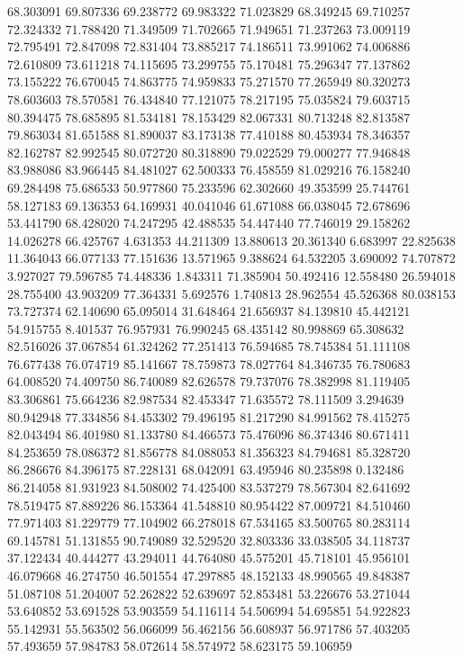 68.303091
69.807336
69.238772
69.983322
71.023829
68.349245
69.710257
72.324332
71.788420
71.349509
71.702665
71.949651
71.237263
73.009119
72.795491
72.847098
72.831404
73.885217
74.186511
73.991062
74.006886
72.610809
73.611218
74.115695
73.299755
75.170481
75.296347
77.137862
73.155222
76.670045
74.863775
74.959833
75.271570
77.265949
80.320273
78.603603
78.570581
76.434840
77.121075
78.217195
75.035824
79.603715
80.394475
78.685895
81.534181
78.153429
82.067331
80.713248
82.813587
79.863034
81.651588
81.890037
83.173138
77.410188
80.453934
78.346357
82.162787
82.992545
80.072720
80.318890
79.022529
79.000277
77.946848
83.988086
83.966445
84.481027
62.500333
76.458559
81.029216
76.158240
69.284498
75.686533
50.977860
75.233596
62.302660
49.353599
25.744761
58.127183
69.136353
64.169931
40.041046
61.671088
66.038045
72.678696
53.441790
68.428020
74.247295
42.488535
54.447440
77.746019
29.158262
14.026278
66.425767
4.631353
44.211309
13.880613
20.361340
6.683997
22.825638
11.364043
66.077133
77.151636
13.571965
9.388624
64.532205
3.690092
74.707872
3.927027
79.596785
74.448336
1.843311
71.385904
50.492416
12.558480
26.594018
28.755400
43.903209
77.364331
5.692576
1.740813
28.962554
45.526368
80.038153
73.727374
62.140690
65.095014
31.648464
21.656937
84.139810
45.442121
54.915755
8.401537
76.957931
76.990245
68.435142
80.998869
65.308632
82.516026
37.067854
61.324262
77.251413
76.594685
78.745384
51.111108
76.677438
76.074719
85.141667
78.759873
78.027764
84.346735
76.780683
64.008520
74.409750
86.740089
82.626578
79.737076
78.382998
81.119405
83.306861
75.664236
82.987534
82.453347
71.635572
78.111509
3.294639
80.942948
77.334856
84.453302
79.496195
81.217290
84.991562
78.415275
82.043494
86.401980
81.133780
84.466573
75.476096
86.374346
80.671411
84.253659
78.086372
81.856778
84.088053
81.356323
84.794681
85.328720
86.286676
84.396175
87.228131
68.042091
63.495946
80.235898
0.132486
86.214058
81.931923
84.508002
74.425400
83.537279
78.567304
82.641692
78.519475
87.889226
86.153364
41.548810
80.954422
87.009721
84.510460
77.971403
81.229779
77.104902
66.278018
67.534165
83.500765
80.283114
69.145781
51.131855
90.749089
32.529520
32.803336
33.038505
34.118737
37.122434
40.444277
43.294011
44.764080
45.575201
45.718101
45.956101
46.079668
46.274750
46.501554
47.297885
48.152133
48.990565
49.848387
51.087108
51.204007
52.262822
52.639697
52.853481
53.226676
53.271044
53.640852
53.691528
53.903559
54.116114
54.506994
54.695851
54.922823
55.142931
55.563502
56.066099
56.462156
56.608937
56.971786
57.403205
57.493659
57.984783
58.072614
58.574972
58.623175
59.106959

